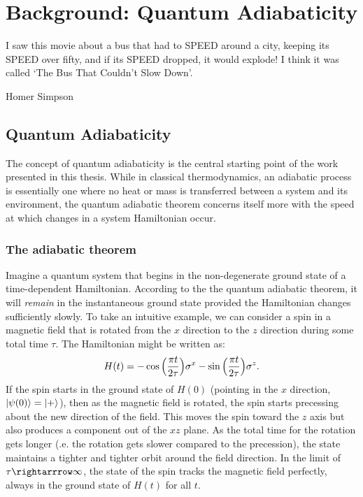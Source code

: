 \chapter{Background: Quantum Adiabaticity}

\epigraph{I saw this movie about a bus that had to SPEED around a city, keeping its SPEED over fifty, and if its SPEED dropped, it would explode! I think it was called `The Bus That Couldn’t Slow Down'.}{Homer Simpson}

    \section{Quantum Adiabaticity}
    
        The concept of quantum adiabaticity is the central starting point of the work presented in this thesis. While in classical thermodynamics, an adiabatic process is essentially one where no heat or mass is transferred between a system and its environment, the quantum adiabatic theorem concerns itself more with the speed at which changes in a system Hamiltonian occur. 
        
        \subsection{The adiabatic theorem}
        
        Imagine a quantum system that begins in the non-degenerate ground state of a time-dependent Hamiltonian. According to the the quantum adiabatic theorem, it will \emph{remain} in the instantaneous ground state provided the Hamiltonian changes sufficiently slowly. To take an intuitive example, we can consider a spin in a magnetic field that is rotated from the $x$ direction to the $z$ direction during some total time $\tau$. The Hamiltonian might be written as:
        \begin{equation}\label{eq:rotating_spin_H}
            H(t) = -\cos\Big(\frac{\pi t}{2 \tau}\Big)\sigma^x - \sin \Big(\frac{\pi t}{2 \tau}\Big)\sigma^z.
        \end{equation}
        If the spin starts in the ground state of $H(0)$ (pointing in the $x$ direction, $\ket{\psi(0)} = \ket{+}$), then as the magnetic field is rotated, the spin starts precessing about the new direction of the field. This moves the spin toward the $z$ axis but also produces a component out of the $xz$ plane. As the total time for the rotation gets longer (\@i.e. the rotation gets slower compared to the precession), the state maintains a tighter and tighter orbit around the field direction. In the limit of $\tau \rightarrrow \infty$, the state of the spin tracks the magnetic field perfectly, always in the ground state of $H(t)$ for all $t$.


